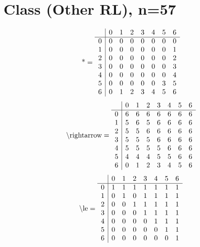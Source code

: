 \documentclass[11pt]{article}
\begin{document}
\section{Class (Other RL), n=57}
\[\text{*} = 
\begin{array}{r | r r r r r r r}
 & 0 & 1 & 2 & 3 & 4 & 5 & 6 \\ \hline
0 & 0 & 0 & 0 & 0 & 0 & 0 & 0 \\
1 & 0 & 0 & 0 & 0 & 0 & 0 & 1 \\
2 & 0 & 0 & 0 & 0 & 0 & 0 & 2 \\
3 & 0 & 0 & 0 & 0 & 0 & 0 & 3 \\
4 & 0 & 0 & 0 & 0 & 0 & 0 & 4 \\
5 & 0 & 0 & 0 & 0 & 0 & 3 & 5 \\
6 & 0 & 1 & 2 & 3 & 4 & 5 & 6 \\
\end{array}
\]
\[\text{\textbackslash rightarrow} = 
\begin{array}{r | r r r r r r r}
 & 0 & 1 & 2 & 3 & 4 & 5 & 6 \\ \hline
0 & 6 & 6 & 6 & 6 & 6 & 6 & 6 \\
1 & 5 & 6 & 5 & 6 & 6 & 6 & 6 \\
2 & 5 & 5 & 6 & 6 & 6 & 6 & 6 \\
3 & 5 & 5 & 5 & 6 & 6 & 6 & 6 \\
4 & 5 & 5 & 5 & 5 & 6 & 6 & 6 \\
5 & 4 & 4 & 4 & 5 & 5 & 6 & 6 \\
6 & 0 & 1 & 2 & 3 & 4 & 5 & 6 \\
\end{array}
\]
\[\text{\textbackslash le} = 
\begin{array}{r | r r r r r r r}
 & 0 & 1 & 2 & 3 & 4 & 5 & 6 \\ \hline
0 & 1 & 1 & 1 & 1 & 1 & 1 & 1 \\
1 & 0 & 1 & 0 & 1 & 1 & 1 & 1 \\
2 & 0 & 0 & 1 & 1 & 1 & 1 & 1 \\
3 & 0 & 0 & 0 & 1 & 1 & 1 & 1 \\
4 & 0 & 0 & 0 & 0 & 1 & 1 & 1 \\
5 & 0 & 0 & 0 & 0 & 0 & 1 & 1 \\
6 & 0 & 0 & 0 & 0 & 0 & 0 & 1 \\
\end{array}
\]
\end{document}
